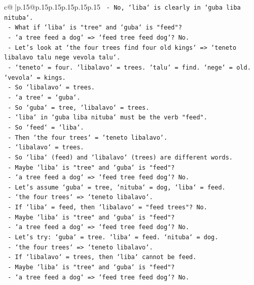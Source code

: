 \documentclass{article}
\begin{document}
{\begin{supertabular}{c@{$\;$}|p{.15\linewidth}@{}p{.15\linewidth}p{.15\linewidth}p{.15\linewidth}p{.15\linewidth}p{.15\linewidth}}
{{{\texttt{  {-} No, `liba` is clearly in `guba liba nituba`.} \\
\texttt{  {-} What if `liba` is "tree" and `guba` is "feed"?} \\
\texttt{  {-} `a tree feed a dog` => `feed tree feed dog`? No.} \\
\texttt{  {-} Let's look at `the four trees find four old kings` => `teneto libalavo talu nege vevola talu`.} \\
\texttt{  {-} `teneto` = four. `libalavo` = trees. `talu` = find. `nege` = old. `vevola` = kings.} \\
\texttt{  {-} So `libalavo` = trees.} \\
\texttt{  {-} `a tree` = `guba`.} \\
\texttt{  {-} So `guba` = tree, `libalavo` = trees.} \\
\texttt{  {-} `liba` in `guba liba nituba` must be the verb "feed".} \\
\texttt{  {-} So `feed` = `liba`.} \\
\texttt{  {-} Then `the four trees` = `teneto libalavo`.} \\
\texttt{  {-} `libalavo` = trees.} \\
\texttt{  {-} So `liba` (feed) and `libalavo` (trees) are different words.} \\
\texttt{  {-} Maybe `liba` is "tree" and `guba` is "feed"?} \\
\texttt{  {-} `a tree feed a dog` => `feed tree feed dog`? No.} \\
\texttt{  {-} Let's assume `guba` = tree, `nituba` = dog, `liba` = feed.} \\
\texttt{  {-} `the four trees` => `teneto libalavo`.} \\
\texttt{  {-} If `liba` = feed, then `libalavo` = "feed trees"? No.} \\
\texttt{  {-} Maybe `liba` is "tree" and `guba` is "feed"?} \\
\texttt{  {-} `a tree feed a dog` => `feed tree feed dog`? No.} \\
\texttt{  {-} Let's try: `guba` = tree. `liba` = feed. `nituba` = dog.} \\
\texttt{  {-} `the four trees` => `teneto libalavo`.} \\
\texttt{  {-} If `libalavo` = trees, then `liba` cannot be feed.} \\
\texttt{  {-} Maybe `liba` is "tree" and `guba` is "feed"?} \\
\texttt{  {-} `a tree feed a dog` => `feed tree feed dog`? No.} \\
}}}
\end{supertabular}}
\end{document}

